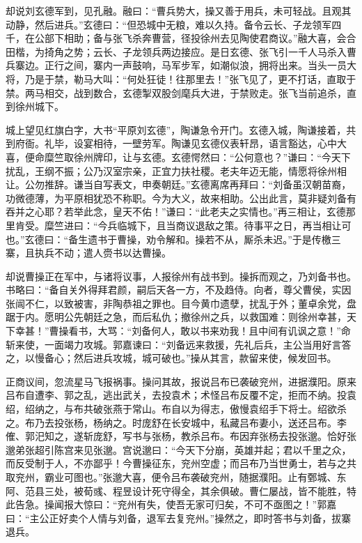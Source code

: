 却说刘玄德军到，见孔融。融曰：“曹兵势大，操又善于用兵，未可轻战。且观其动静，然后进兵。”玄德曰：“但恐城中无粮，难以久持。备令云长、子龙领军四千，在公部下相助；备与张飞杀奔曹营，径投徐州去见陶使君商议。”融大喜，会合田楷，为掎角之势；云长、子龙领兵两边接应。是日玄德、张飞引一千人马杀入曹兵寨边。正行之间，寨内一声鼓响，马军步军，如潮似浪，拥将出来。当头一员大将，乃是于禁，勒马大叫：“何处狂徒！往那里去！”张飞见了，更不打话，直取于禁。两马相交，战到数合，玄德掣双股剑麾兵大进，于禁败走。张飞当前追杀，直到徐州城下。

城上望见红旗白字，大书“平原刘玄德”，陶谦急令开门。玄德入城，陶谦接着，共到府衙。礼毕，设宴相待，一壁劳军。陶谦见玄德仪表轩昂，语言豁达，心中大喜，便命糜竺取徐州牌印，让与玄德。玄德愕然曰：“公何意也？”谦曰：“今天下扰乱，王纲不振；公乃汉室宗亲，正宜力扶社稷。老夫年迈无能，情愿将徐州相让。公勿推辞。谦当自写表文，申奏朝廷。”玄德离席再拜曰：“刘备虽汉朝苗裔，功微德薄，为平原相犹恐不称职。今为大义，故来相助。公出此言，莫非疑刘备有吞并之心耶？若举此念，皇天不佑！”谦曰：“此老夫之实情也。”再三相让，玄德那里肯受。糜竺进曰：“今兵临城下，且当商议退敌之策。待事平之日，再当相让可也。”玄德曰：“备生遗书于曹操，劝令解和。操若不从，厮杀未迟。”于是传檄三寨，且执兵不动；遣人赍书以达曹操。

却说曹操正在军中，与诸将议事，人报徐州有战书到。操拆而观之，乃刘备书也。书略曰：“备自关外得拜君颜，嗣后天各一方，不及趋侍。向者，尊父曹侯，实因张闿不仁，以致被害，非陶恭祖之罪也。目今黄巾遗孽，扰乱于外；董卓余党，盘踞于内。愿明公先朝廷之急，而后私仇；撤徐州之兵，以救国难：则徐州幸甚，天下幸甚！”曹操看书，大骂：“刘备何人，敢以书来劝我！且中间有讥讽之意！”命斩来使，一面竭力攻城。郭嘉谏曰：“刘备远来救援，先礼后兵，主公当用好言答之，以慢备心；然后进兵攻城，城可破也。”操从其言，款留来使，候发回书。

正商议间，忽流星马飞报祸事。操问其故，报说吕布已袭破兖州，进据濮阳。原来吕布自遭李、郭之乱，逃出武关，去投袁术；术怪吕布反覆不定，拒而不纳。投袁绍，绍纳之，与布共破张燕于常山。布自以为得志，傲慢袁绍手下将士。绍欲杀之。布乃去投张杨，杨纳之。时庞舒在长安城中，私藏吕布妻小，送还吕布。李傕、郭汜知之，遂斩庞舒，写书与张杨，教杀吕布。布因弃张杨去投张邈。恰好张邈弟张超引陈宫来见张邈。宫说邈曰：“今天下分崩，英雄并起；君以千里之众，而反受制于人，不亦鄙乎！今曹操征东，兖州空虚；而吕布乃当世勇士，若与之共取兖州，霸业可图也。”张邈大喜，便令吕布袭破兖州，随据濮阳。止有鄄城、东阿、范县三处，被荀彧、程昱设计死守得全，其余俱破。曹仁屡战，皆不能胜，特此告急。操闻报大惊曰：“兖州有失，使吾无家可归矣，不可不亟图之！”郭嘉曰：“主公正好卖个人情与刘备，退军去复兖州。”操然之，即时答书与刘备，拔寨退兵。

